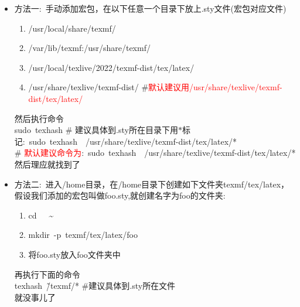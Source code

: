 \documentclass[10pt, oneside, a4paper]{article}      %
\begin{document}
\begin{itemize}
	\item 方法一:~手动添加宏包，在以下任意一个目录下放上\textrm{.sty}文件(宏包对应文件)
		\begin{enumerate}
			\item \textrm{/usr/local/share/texmf/}
			\item \textrm{/var/lib/texmf:/usr/share/texmf/}
			\item \textrm{/usr/local/texlive/2022/texmf-dist/tex/latex/}
			\item \textrm{/usr/share/texlive/texmf-dist/} \qquad\#\textcolor{red}{默认建议用\textrm{/usr/share/texlive/texmf-dist/tex/latex/}}
		\end{enumerate}
然后执行命令\\
\textrm{sudo~texhash} \qquad\# 建议具体到\textrm{.sty}所在目录下用$\ast$标记:~\textrm{sudo~texhash~~/usr/share/texlive/texmf-dist/tex/latex/*}\\
\# \textcolor{red}{默认建议命令为}:~\textrm{sudo~texhash~~/usr/share/texlive/texmf-dist/tex/latex/*}\\
然后理应就找到了
\item 方法二:~进入\textrm{/home}目录，在\textrm{/home}目录下创建如下文件夹\textrm{texmf/tex/latex}，假设我们添加的宏包叫做\textrm{foo.sty},就创建名字为\textrm{foo}的文件夹:
	\begin{enumerate}
		\item \textrm{cd~~~\~}
		\item \textrm{mkdir~-p~texmf/tex/latex/foo}
		\item 将\textrm{foo.sty}放入\textrm{foo}文件夹中
	\end{enumerate}
再执行下面的命令\\
\textrm{texhash~\~/texmf/*} \#建议具体到\textrm{.sty}所在文件\\
就没事儿了


\end{itemize}
\end{document}

